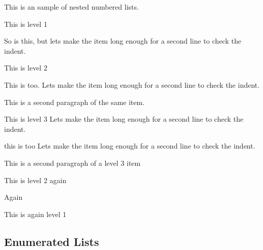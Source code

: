 This is an sample of nested numbered lists.
\begin{numenum}
  \item This is level 1
  \item So is this, but lets make the item long enough for a second
        line to check the indent. 
  \begin{numenum}
    \item This is level 2
    \item This is too.  Lets make the item long enough for a second
          line to check the indent. 

          This is a second paragraph of the same item.
    \begin{numenum}
      \item This is level 3 Lets make the item long enough for a
            second line to check the indent.
      \item this is too Lets make the item long enough for a second
            line  to check the indent.

            This is a second paragraph of a level 3 item
    \end{numenum}
    \item This is level 2 again
    \begin{numenum}
      \item Again
    \end{numenum}
  \end{numenum}
  \item This is again level 1
\end{numenum}

\subsection{Enumerated Lists}


